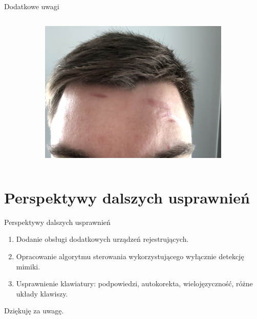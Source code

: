\documentclass[10pt,aspectratio=169]{beamer}
\begin{document}
\begin{frame}{Dodatkowe uwagi}
\begin{columns}
\begin{column}{0.5\textwidth}
{\begin{figure}[htb]
\begin{subfigure}{\linewidth}
          \includegraphics[width=\linewidth,height=0.4\textheight,keepaspectratio]{obrazy/headset_after}
          \end{subfigure}
        \end{figure}
      }
    \end{column}
  \end{columns}
\end{frame}

\section{Perspektywy dalszych usprawnień}

\begin{frame}{Perspektywy dalszych usprawnień}
  \begin{enumerate}[<+-|alert@+>]
    \item Dodanie obsługi dodatkowych urządzeń rejestrujących.
    \item Opracowanie algorytmu sterowania wykorzystującego wyłącznie detekcję mimiki.
    \item Usprawnienie klawiatury: podpowiedzi, autokorekta, wielojęzyczność, różne układy klawiszy.
  \end{enumerate}
\end{frame}

\begin{frame}[standout]
  Dziękuję za uwagę.
\end{frame}
\end{document}
